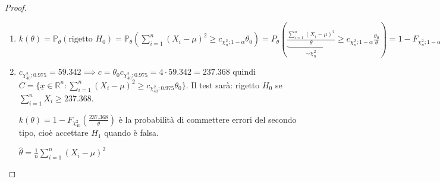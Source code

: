 \documentclass[hidelinks, 10pt]{report}
\begin{document}
\begin{proof}
\begin{enumerate}
\begin{enumerate}
Il test UMP \`e
\[
\Phi (\underline{X}) = \begin{cases}
1 & \sum\limits_{i = 1}^{n} (X_{i} - \mu)^{2} \ge c \\ 0 & \text{altrimenti}
\end{cases}
\]

con 

$ \mathbb{P}_{\theta_{0}} (\sum\limits_{i = 1}^{n} (X_{i} - \mu)^{2} \ge c) = \alpha $
\end{enumerate}
\item $ k(\theta) = \mathbb{P}_{\theta} (\text{rigetto } H_{0}) = \mathbb{P}_{\theta} \left(\sum\limits_{i = 1}^{n} (X_{i} - \mu)^{2} \ge c_{\chi^{2}_{n}; 1 - \alpha} \theta_{0} \right) = P_{\theta} \left( \underbrace{\frac{\sum\limits_{i = 1}^{n} (X_{i} - \mu)^{2}}{\theta}}_{\sim \chi^{2}_{n}} \ge c_{\chi^{2}_{n}; 1 - \alpha} \frac{\theta_{0}}{\theta} \right) = 1 - F_{\chi^{2}_{n}; 1 - \alpha} \left( \frac{c_{\chi^{2}_{n}; 1 - \alpha} \theta_{0}}{\theta} \right) $
\item $ c_{\chi^{2}_{40}; 0.975} = 59.342 \implies c = \theta_{0} c_{\chi^{2}_{40}; 0.975} = 4 \cdot 59.342 = 237.368 $ quindi $ C = \{ \underline{x} \in \mathbb{R}^{n} : \sum\limits_{i = 1}^{n} (X_{i} - \mu)^{2} \ge c_{\chi^{2}_{40}; 0.975} \theta_{0} \} $. Il test sar\`a: rigetto $ H_{0} $ se $ \sum\limits_{i = 1}^{n} X_{i} \ge 237.368 $.

$ k(\theta) = 1 - F_{\chi^{2}_{40}} \left( \frac{237.368}{\theta} \right) $ \`e la probabilit\`a di commettere errori del secondo tipo, cio\`e accettare  $ H_{1} $ quando \`e falsa.

$ \hat{\theta} = \frac{1}{n} \sum\limits_{i = 1}^{n} (X_{i} - \mu)^{2} $
\end{enumerate}
\end{proof}
\end{document}
